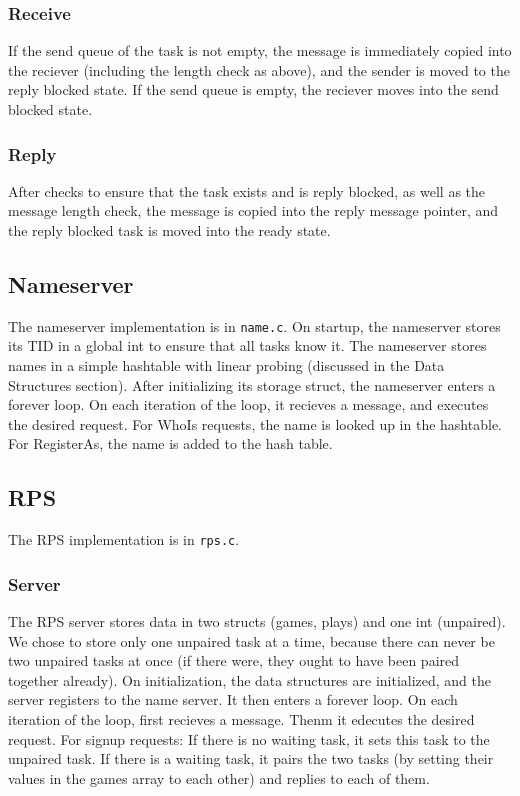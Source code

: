 \documentclass{article}
\begin{document}
\subsubsection{Receive}
    If the send queue of the task is not empty, the message is immediately copied into the reciever (including the length check as above), and the sender is moved to the reply blocked state.
    If the send queue is empty, the reciever moves into the send blocked state.
\subsubsection{Reply}
    After checks to ensure that the task exists and is reply blocked, as well as the message length check, the message is copied into the reply message pointer, and the reply blocked task is moved into the ready state.
\subsection{Nameserver}
    The nameserver implementation is in \verb|name.c|.
    On startup, the nameserver stores its TID in a global int to ensure that all tasks know it.
    The nameserver stores names in a simple hashtable with linear probing (discussed in the Data Structures section).
    After initializing its storage struct, the nameserver enters a forever loop.
    On each iteration of the loop, it recieves a message, and executes the desired request.
    For WhoIs requests, the name is looked up in the hashtable.
    For RegisterAs, the name is added to the hash table.
\subsection{RPS}
   The RPS implementation is in \verb|rps.c|.
\subsubsection{Server}
   The RPS server stores data in two structs (games, plays) and one int (unpaired).
   We chose to store only one unpaired task at a time, because there can never be two unpaired tasks at once (if there were, they ought to have been paired together already).
   On initialization, the data structures are initialized, and the server registers to the name server.
   It then enters a forever loop.
   On each iteration of the loop, first recieves a message. Thenm it edecutes the desired request.
   For signup requests: If there is no waiting task, it sets this task to the unpaired task.
   If there is a waiting task, it pairs the two tasks (by setting their values in the games array to each other) and replies to each of them.
\end{document}

